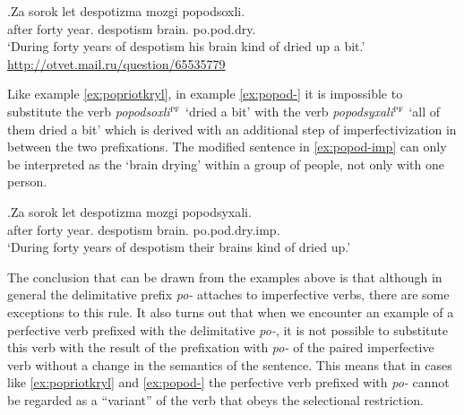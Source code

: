 \exg.\label{ex:popod-}Za sorok let despotizma mozgi popodsoxli.\\
after forty year. despotism brain. po.pod.dry.\\
\trans `During forty years of despotism his brain kind of dried up a bit.'\\\hbox{}\hfill\hbox{\url{http://otvet.mail.ru/question/65535779}}

Like example \ref{ex:popriotkryl}, in example \ref{ex:popod-} it is impossible to substitute the verb \textit{popodsoxli}$^{\textsc{pf}}$ `dried a bit' with the verb \textit{popodsyxali}$^{\textsc{pf}}$ `all of them dried a bit' which is derived with an additional step of imperfectivization in between the two prefixations. The modified sentence in \ref{ex:popod-imp} can only be interpreted as the `brain drying' within a group of people, not only with one person.  

\exg.\label{ex:popod-imp}Za sorok let despotizma mozgi popodsyxali.\\
after forty year. despotism brain. po.pod.dry.imp.\\
\trans `During forty years of despotism their brains kind of dried up.'

The conclusion that can be drawn from the examples above is that although in general the delimitative prefix \textit{po-} attaches to imperfective verbs, there are some exceptions to this rule. It also turns out that when we encounter an example of a perfective verb prefixed with the delimitative \textit{po-}, it is not possible to substitute this verb with the result of the prefixation with \textit{po-} of the paired imperfective verb without a change in the semantics of the sentence. This means that in cases like \ref{ex:popriotkryl} and \ref{ex:popod-} the perfective verb prefixed with \textit{po-} cannot be regarded as a ``variant'' of the verb that obeys the selectional restriction.
 
